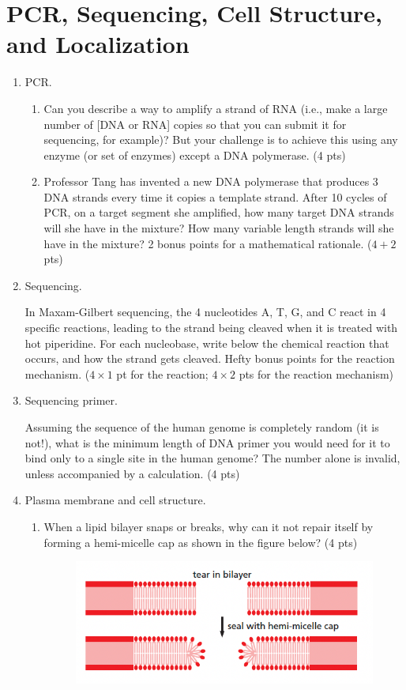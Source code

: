 \documentclass[../psets.tex]{subfiles}
\begin{document}
\section{PCR, Sequencing, Cell Structure, and Localization}
\begin{enumerate}
    \item {}PCR.
    \begin{enumerate}
        \item Can you describe a way to amplify a strand of RNA (i.e., make a large number of [DNA or RNA] copies so that you can submit it for sequencing, for example)? But your challenge is to achieve this using any enzyme (or set of enzymes) except a DNA polymerase. (4 pts)
        \item Professor Tang has invented a new DNA polymerase that produces 3 DNA strands every time it copies a template strand. After 10 cycles of PCR, on a target segment she amplified, how many target DNA strands will she have in the mixture? How many variable length strands will she have in the mixture? 2 bonus points for a mathematical rationale. ($4+2$ pts)
    \end{enumerate}
    \item Sequencing.\par
    In Maxam-Gilbert sequencing, the 4 nucleotides A, T, G, and C react in 4 specific reactions, leading to the strand being cleaved when it is treated with hot piperidine. For each nucleobase, write below the chemical reaction that occurs, and how the strand gets cleaved. Hefty bonus points for the reaction mechanism. ($4\times 1$ pt for the reaction; $4\times 2$ pts for the reaction mechanism)
    \item Sequencing primer.\par
    Assuming the sequence of the human genome is completely random (it is not!), what is the minimum length of DNA primer you would need for it to bind only to a single site in the human genome? The number alone is invalid, unless accompanied by a calculation. (4 pts)
    \item Plasma membrane and cell structure.
    \begin{enumerate}
        \item When a lipid bilayer snaps or breaks, why can it not repair itself by forming a hemi-micelle cap as shown in the figure below? (4 pts)
        \begin{figure}[h!]
            \centering
            \includegraphics[width=0.4\linewidth]{../ExtFiles/pset3-hemiMicelle.png}

\end{figure}
\end{enumerate}
\end{enumerate}
\end{document}
